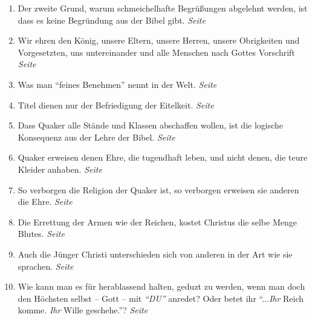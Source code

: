 \begin{enumerate}
 \item Der zweite Grund, warum schmeichelhafte Begrüßungen abgelehnt werden, ist
dass es keine Begründung aus der Bibel gibt.
 \dotfill \textit{Seite~\pageref{ref:09_20_zeiter_grund}}\\

 \item Wir ehren den König, unsere Eltern,
unsere Herren, unsere Obrigkeiten
und Vorgesetzten, uns untereinander und alle
Menschen nach Gottes Vorschrift
 \dotfill \textit{Seite~\pageref{ref:09_20_koenig}}\\

 \item Was man "`feines Benehmen"' nennt in der Welt.
 \dotfill \textit{Seite~\pageref{ref:09_26_feines_benemen}}\\

 \item Titel dienen nur der Befriedigung der Eitelkeit.
 \dotfill \textit{Seite~\pageref{ref:09_31_heuchelei}}\\

 \item Dass Quaker alle Stände und Klassen abschaffen wollen, ist die logische
Konsequenz aus der Lehre der Bibel.
 \dotfill \textit{Seite
\pageref{ref:09_35_staende_abschaffen}}\\

 \item Quaker erweisen denen Ehre, die tugendhaft leben, und nicht denen, die
teure Kleider anhaben.
 \dotfill \textit{Seite~\pageref{ref:09_36_ehre_erweisen}}\\

 \item So verborgen die Religion der Quaker ist, so verborgen erweisen sie
anderen die Ehre.
 \dotfill \textit{Seite~\pageref{ref:09_37_ehre_erweisen}}\\

 \item Die Errettung der Armen wie der Reichen, kostet Christus die selbe Menge
Blutes.
 \dotfill \textit{Seite~\pageref{ref:09_39_erettung}}\\

 \item Auch die Jünger Christi unterschieden sich von anderen in der Art wie sie
sprachen.
 \dotfill \textit{Seite~\pageref{ref:10_08_sprache}}\\

 \item Wie kann man es für herablassend halten, geduzt zu werden, wenn man doch
den Höchsten selbst -- Gott -- mit \textit{"`DU"'} anredet? Oder betet ihr
"`...\textit{Ihr} Reich komme. \textit{Ihr} Wille geschehe."'?
 \dotfill \textit{Seite~\pageref{ref:10_08_duzen}}\\


\end{enumerate}
